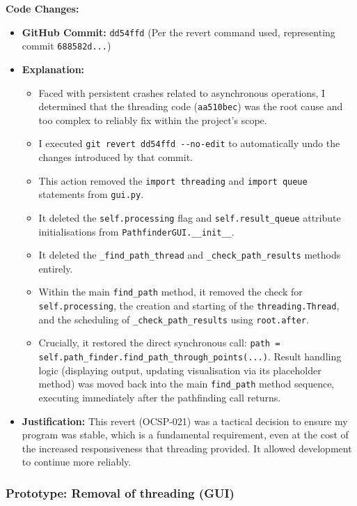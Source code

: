 	\textbf{Code Changes:}
	\begin{itemize}
		\item \textbf{GitHub Commit:} \verb|dd54ffd| (Per the revert command used, representing commit \verb|688582d...|)
		\item \textbf{Explanation:}
		\begin{itemize}
			\item Faced with persistent crashes related to asynchronous operations, I determined that the threading code (\verb|aa510bec|) was the root cause and too complex to reliably fix within the project's scope.
			\item I executed \verb|git revert dd54ffd --no-edit| to automatically undo the changes introduced by that commit.
			\item This action removed the \verb|import threading| and \verb|import queue| statements from \verb|gui.py|.
			\item It deleted the \verb|self.processing| flag and \verb|self.result_queue| attribute initialisations from \verb|PathfinderGUI.__init__|.
			\item It deleted the \verb|_find_path_thread| and \verb|_check_path_results| methods entirely.
			\item Within the main \verb|find_path| method, it removed the check for \verb|self.processing|, the creation and starting of the \verb|threading.Thread|, and the scheduling of \verb|_check_path_results| using \verb|root.after|.
			\item Crucially, it restored the direct synchronous call: \verb|path = self.path_finder.find_path_through_points(...)|. Result handling logic (displaying output, updating visualisation via its placeholder method) was moved back into the main \verb|find_path| method sequence, executing immediately after the pathfinding call returns.
		\end{itemize}
		\item \textbf{Justification:} This revert (OCSP-021) was a tactical decision to ensure my program was stable, which is a fundamental requirement, even at the cost of the increased responsiveness that threading provided. It allowed development to continue more reliably.
	\end{itemize}
	

\newpage
\subsubsection*{Prototype: Removal of threading (GUI)}

